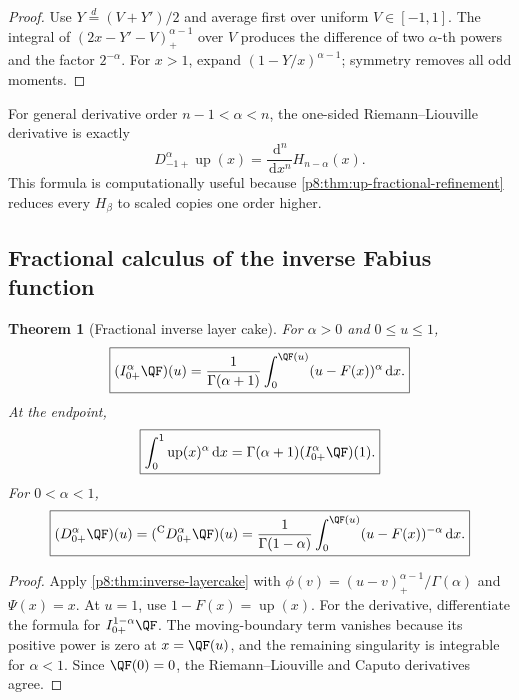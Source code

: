 \documentclass[11pt,oneside]{article}
\newtheorem{theorem}{Theorem}[section]
\theoremstyle{definition}
\theoremstyle{remark}
\newcommand{\Up}{\operatorname{up}}
\newcommand{\dd}{\,\mathrm d}
\newcommand{\1}{\mathbf 1}
\begin{document}
\begin{proof}
Use \(Y\stackrel d=(V+Y')/2\) and average first over uniform
\(V\in[-1,1]\).  The integral of \((2x-Y'-V)_+^{\alpha-1}\) over \(V\)
produces the difference of two \(\alpha\)-th powers and the factor
\(2^{-\alpha}\).  For \(x>1\), expand
\((1-Y/x)^{\alpha-1}\); symmetry removes all odd moments.
\end{proof}

For general derivative order \(n-1<\alpha<n\), the one-sided
Riemann--Liouville derivative is exactly
\begin{equation}
 D_{-1+}^{\alpha}\Up(x)
 =\frac{\dd^n}{\dd x^n}H_{n-\alpha}(x).
 \label{p8:eq:up-RL-derivative-H}
\end{equation}
This formula is computationally useful because \cref{p8:thm:up-fractional-refinement}
reduces every \(H_\beta\) to scaled copies one order higher.

\subsection{Fractional calculus of the inverse Fabius function}

\begin{theorem}[Fractional inverse layer cake]
\label{p8:thm:Q-fractional}
For \(\alpha>0\) and \(0\le u\le1\),
\begin{equation}
 \boxed{
 (I_{0+}^{\alpha}\QF)(u)
 =\frac1{\Gamma(\alpha+1)}
 \int_0^{\QF(u)}(u-F(x))^\alpha\dd x.}
 \label{p8:eq:Q-fractional-integral}
\end{equation}
At the endpoint,
\begin{equation}
 \boxed{
 \int_0^1\Up(x)^\alpha\dd x
 =\Gamma(\alpha+1)(I_{0+}^{\alpha}\QF)(1).}
 \label{p8:eq:power-fractional-bridge}
\end{equation}
For \(0<\alpha<1\),
\begin{equation}
 \boxed{
 (D_{0+}^{\alpha}\QF)(u)
 =({}^{\mathrm C}D_{0+}^{\alpha}\QF)(u)
 =\frac1{\Gamma(1-\alpha)}
 \int_0^{\QF(u)}(u-F(x))^{-\alpha}\dd x.}
 \label{p8:eq:Q-fractional-derivative}
\end{equation}
\statusprovedPartll
\end{theorem}

\begin{proof}
Apply \cref{p8:thm:inverse-layercake} with
\(\phi(v)=(u-v)_+^{\alpha-1}/\Gamma(\alpha)\) and \(\Psi(x)=x\).
At \(u=1\), use \(1-F(x)=\Up(x)\).  For the derivative, differentiate the
formula for \(I_{0+}^{1-\alpha}\QF\).  The moving-boundary term vanishes because
its positive power is zero at \(x=\QF(u)\), and the remaining singularity is
integrable for \(\alpha<1\).  Since \(\QF(0)=0\), the Riemann--Liouville and
Caputo derivatives agree.
\end{proof}
\end{document}
